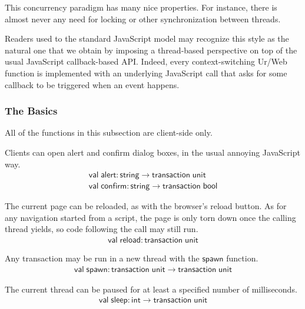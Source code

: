 \documentclass{article}
\newcommand{\mt}[1]{\mathsf{#1}}
\begin{document}
This concurrency paradigm has many nice properties.  For instance, there is almost never any need for locking or other synchronization between threads.

Readers used to the standard JavaScript model may recognize this style as the natural one that we obtain by imposing a thread-based perspective on top of the usual JavaScript callback-based API.  Indeed, every context-switching Ur/Web function is implemented with an underlying JavaScript call that asks for some callback to be triggered when an event happens.

\subsubsection{The Basics}

All of the functions in this subsection are client-side only.

Clients can open alert and confirm dialog boxes, in the usual annoying JavaScript way.
$$\begin{array}{l}
  \mt{val} \; \mt{alert} : \mt{string} \to \mt{transaction} \; \mt{unit} \\
  \mt{val} \; \mt{confirm} : \mt{string} \to \mt{transaction} \; \mt{bool}
\end{array}$$

The current page can be reloaded, as with the browser's reload button.  As for any navigation started from a script, the page is only torn down once the calling thread yields, so code following the call may still run.
$$\begin{array}{l}
  \mt{val} \; \mt{reload} : \mt{transaction} \; \mt{unit}
\end{array}$$

Any transaction may be run in a new thread with the $\mt{spawn}$ function.
$$\begin{array}{l}
  \mt{val} \; \mt{spawn} : \mt{transaction} \; \mt{unit} \to \mt{transaction} \; \mt{unit}
\end{array}$$

The current thread can be paused for at least a specified number of milliseconds.
$$\begin{array}{l}
  \mt{val} \; \mt{sleep} : \mt{int} \to \mt{transaction} \; \mt{unit}
\end{array}$$
\end{document}
